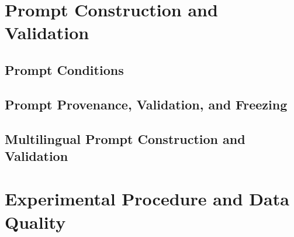 \documentclass[logo,msc]{infthesis}           %
\begin{document}
\hypertarget{prompt-construction-and-validation}{%
\section{Prompt Construction and Validation}\label{prompt-construction-and-validation}}

\hypertarget{prompt-conditions}{%
\subsection{Prompt Conditions}\label{prompt-conditions}}

\hypertarget{prompt-provenance-validation-and-freezing}{%
\subsection{Prompt Provenance, Validation, and Freezing}\label{prompt-provenance-validation-and-freezing}}

\hypertarget{multilingual-prompt-construction-and-validation}{%
\subsection{Multilingual Prompt Construction and Validation}\label{multilingual-prompt-construction-and-validation}}

\hypertarget{experimental-procedure-and-data-quality}{%
\section{Experimental Procedure and Data Quality}\label{experimental-procedure-and-data-quality}}
\end{document}
